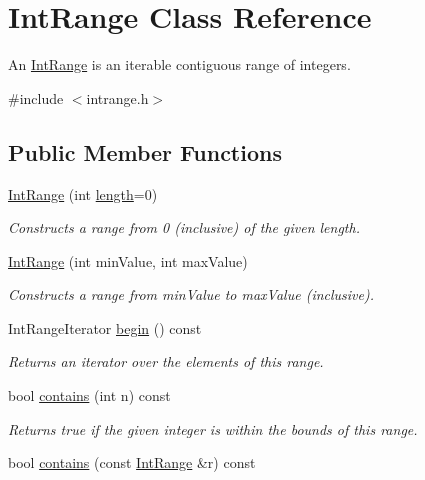 \hypertarget{classIntRange}{}\section{Int\+Range Class Reference}
\label{classIntRange}


An \mbox{\hyperlink{classIntRange}{Int\+Range}} is an iterable contiguous range of integers.  




{\ttfamily \#include $<$intrange.\+h$>$}

\subsection*{Public Member Functions}
\begin{DoxyCompactItemize}
\item 
\mbox{\hyperlink{classIntRange_a1371e812388f10db89e8cea0edeec000}{Int\+Range}} (int \mbox{\hyperlink{classIntRange_a91213974fa3ac3959b1c355a9e588f8d}{length}}=0)
\begin{DoxyCompactList}\small\item\em Constructs a range from 0 (inclusive) of the given length. \end{DoxyCompactList}\item 
\mbox{\hyperlink{classIntRange_a9e8543f0451b16061adafee2d9ad0f84}{Int\+Range}} (int min\+Value, int max\+Value)
\begin{DoxyCompactList}\small\item\em Constructs a range from min\+Value to max\+Value (inclusive). \end{DoxyCompactList}\item 
Int\+Range\+Iterator \mbox{\hyperlink{classIntRange_a71b24b84d58ec13662a463eddc2e085c}{begin}} () const
\begin{DoxyCompactList}\small\item\em Returns an iterator over the elements of this range. \end{DoxyCompactList}\item 
bool \mbox{\hyperlink{classIntRange_ab0197de90231da6a241cf66cd6b16edc}{contains}} (int n) const
\begin{DoxyCompactList}\small\item\em Returns true if the given integer is within the bounds of this range. \end{DoxyCompactList}\item 
bool \mbox{\hyperlink{classIntRange_a71626971ecae788078a3ba3e7ffc7201}{contains}} (const \mbox{\hyperlink{classIntRange}{Int\+Range}} \&r) const

\end{DoxyCompactItemize}

